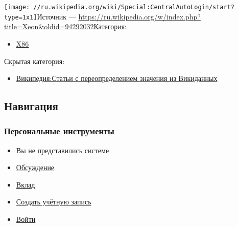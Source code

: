 \documentclass[a4paper,11pt]{article}
\begin{document}
\texttt{[image: //ru.wikipedia.org/wiki/Special:CentralAutoLogin/start?type=1x1]}Источник — \href{https://ru.wikipedia.org/w/index.php?title=Xeon&amp;oldid=94292032}{https://ru.wikipedia.org/w/index.php?title=Xeon\&oldid=94292032}\href{https://ru.wikipedia.org/wiki/%D0%A1%D0%BB%D1%83%D0%B6%D0%B5%D0%B1%D0%BD%D0%B0%D1%8F:%D0%9A%D0%B0%D1%82%D0%B5%D0%B3%D0%BE%D1%80%D0%B8%D0%B8}{Категория}: 
\begin{itemize}
	\item \href{https://ru.wikipedia.org/wiki/%D0%9A%D0%B0%D1%82%D0%B5%D0%B3%D0%BE%D1%80%D0%B8%D1%8F:X86}{X86}
\end{itemize}Скрытая категория: 
\begin{itemize}
	\item \href{https://ru.wikipedia.org/wiki/%D0%9A%D0%B0%D1%82%D0%B5%D0%B3%D0%BE%D1%80%D0%B8%D1%8F:%D0%92%D0%B8%D0%BA%D0%B8%D0%BF%D0%B5%D0%B4%D0%B8%D1%8F:%D0%A1%D1%82%D0%B0%D1%82%D1%8C%D0%B8_%D1%81_%D0%BF%D0%B5%D1%80%D0%B5%D0%BE%D0%BF%D1%80%D0%B5%D0%B4%D0%B5%D0%BB%D0%B5%D0%BD%D0%B8%D0%B5%D0%BC_%D0%B7%D0%BD%D0%B0%D1%87%D0%B5%D0%BD%D0%B8%D1%8F_%D0%B8%D0%B7_%D0%92%D0%B8%D0%BA%D0%B8%D0%B4%D0%B0%D0%BD%D0%BD%D1%8B%D1%85}{Википедия:Статьи с переопределением значения из Викиданных}
\end{itemize}

\subsection{Навигация}

\subsubsection{Персональные инструменты}
\begin{itemize}
	\item Вы не представились системе
	\item \href{https://ru.wikipedia.org/wiki/%D0%A1%D0%BB%D1%83%D0%B6%D0%B5%D0%B1%D0%BD%D0%B0%D1%8F:%D0%9C%D0%BE%D1%91_%D0%BE%D0%B1%D1%81%D1%83%D0%B6%D0%B4%D0%B5%D0%BD%D0%B8%D0%B5}{Обсуждение}
	\item \href{https://ru.wikipedia.org/wiki/%D0%A1%D0%BB%D1%83%D0%B6%D0%B5%D0%B1%D0%BD%D0%B0%D1%8F:%D0%9C%D0%BE%D0%B9_%D0%B2%D0%BA%D0%BB%D0%B0%D0%B4}{Вклад}
	\item \href{https://ru.wikipedia.org/w/index.php?title=%D0%A1%D0%BB%D1%83%D0%B6%D0%B5%D0%B1%D0%BD%D0%B0%D1%8F:%D0%A1%D0%BE%D0%B7%D0%B4%D0%B0%D1%82%D1%8C_%D1%83%D1%87%D1%91%D1%82%D0%BD%D1%83%D1%8E_%D0%B7%D0%B0%D0%BF%D0%B8%D1%81%D1%8C&amp;returnto=Xeon}{Создать учётную запись}
	\item \href{https://ru.wikipedia.org/w/index.php?title=%D0%A1%D0%BB%D1%83%D0%B6%D0%B5%D0%B1%D0%BD%D0%B0%D1%8F:%D0%92%D1%85%D0%BE%D0%B4&amp;returnto=Xeon}{Войти}
\end{itemize}
\end{document}
